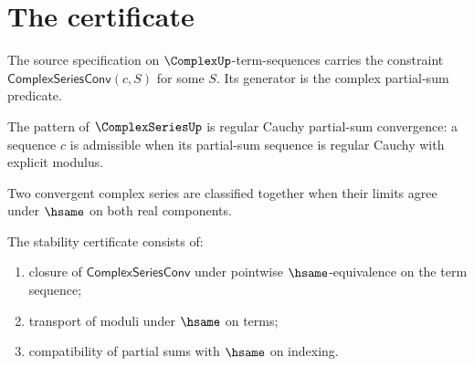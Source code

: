 \section{The certificate}

\begin{definition}
\label{def:complex-series-source-spec}
The source specification on \(\ComplexUp\)-term-sequences carries the constraint \(\mathsf{ComplexSeriesConv}(c, S)\) for some \(S\). Its generator is the complex partial-sum predicate.
\end{definition}

\begin{definition}
\label{def:complex-series-pattern-spec}
The pattern of \(\ComplexSeriesUp\) is regular Cauchy partial-sum convergence: a sequence \(c\) is admissible when its partial-sum sequence is regular Cauchy with explicit modulus.
\end{definition}

\begin{definition}
\label{def:complex-series-classifier-spec}
Two convergent complex series are classified together when their limits agree under \(\hsame\) on both real components.
\end{definition}

\begin{definition}
\label{def:complex-series-stability-cert}
The stability certificate consists of:
\begin{enumerate}
  \item closure of \(\mathsf{ComplexSeriesConv}\) under pointwise \(\hsame\)-equivalence on the term sequence;
  \item transport of moduli under \(\hsame\) on terms;
  \item compatibility of partial sums with \(\hsame\) on indexing.
\end{enumerate}
\end{definition}

